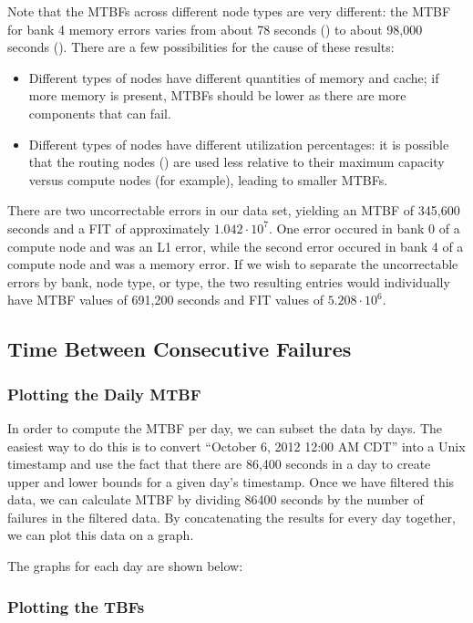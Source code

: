 Note that the MTBFs across different node types are very different: the MTBF for bank 4 memory errors varies from about 78 seconds () to about 98,000 seconds ().  There are a few possibilities for the cause of these results:

\begin{itemize}
\item Different types of nodes have different quantities of memory and cache; if more memory is present, MTBFs should be lower as there are more components that can fail.
\item Different types of nodes have different utilization percentages: it is possible that the routing nodes () are used less relative to their maximum capacity versus compute nodes (for example), leading to smaller MTBFs.
\end{itemize}

There are two uncorrectable errors in our data set, yielding an MTBF of 345,600 seconds and a FIT of approximately $1.042 \cdot 10^7$.  One error occured in bank 0 of a compute node and was an L1 error, while the second error occured in bank 4 of a compute node and was a memory error.  If we wish to separate the uncorrectable errors by bank, node type, or type, the two resulting entries would individually have MTBF values of 691,200 seconds and FIT values of $5.208 \cdot 10^6$.

\subsection{Time Between Consecutive Failures}
\subsubsection{Plotting the Daily MTBF}

In order to compute the MTBF per day, we can subset the data by days.  The easiest way to do this is to convert ``October 6, 2012 12:00 AM CDT'' into a Unix timestamp and use the fact that there are 86,400 seconds in a day to create upper and lower bounds for a given day's timestamp.  Once we have filtered this data, we can calculate MTBF by dividing 86400 seconds by the number of failures in the filtered data.  By concatenating the results for every day together, we can plot this data on a graph.

The graphs for each day are shown below:

\subsubsection{Plotting the TBFs}

